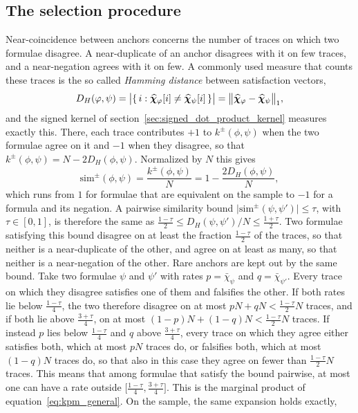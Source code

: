 \documentclass[titlepage,a4paper,11pt]{report}
\begin{document}
    \subsection{The selection procedure}\label{sec:selection_procedure}
    Near-coincidence between anchors concerns the number of traces on which two formulae disagree. A near-duplicate of an anchor disagrees with it on few traces, and a near-negation agrees with it on few. A commonly used measure that counts these traces is the so called \textit{Hamming distance} between satisfaction vectors,
    \begin{equation}\label{eq:hamming_distance}
        D_H(\varphi,\psi)=\bigl|\{\,i:\bm{\widehat\chi}_\varphi[i]\neq\bm{\widehat\chi}_\psi[i]\,\}\bigr|=\bigl\lVert\bm{\widehat\chi}_\varphi-\bm{\widehat\chi}_\psi\bigr\rVert_1 ,
    \end{equation}
    and the signed kernel of section~\ref{sec:signed_dot_product_kernel} measures exactly this. There, each trace contributes $+1$ to $k^\pm(\phi,\psi)$ when the two formulae agree on it and $-1$ when they disagree, so that $k^\pm(\phi,\psi)=N-2D_H(\phi,\psi)$. Normalized by $N$ this gives
    \begin{equation}\label{eq:sim_pm}
        \mathrm{sim}^\pm(\phi,\psi)=\frac{k^\pm(\phi,\psi)}{N}=1-\frac{2D_H(\phi,\psi)}{N},
    \end{equation}
    which runs from $1$ for formulae that are equivalent on the sample to $-1$ for a formula and its negation. A pairwise similarity bound  $\lvert\mathrm{sim}^\pm(\psi,\psi')\rvert\le\tau$, with $\tau \in [0,1]$, is therefore the same as $\frac{1-\tau}{2}\le D_H(\psi,\psi')/N\le\frac{1+\tau}{2}$. Two formulae satisfying this bound disagree on at least the fraction $\frac{1-\tau}{2}$ of the traces, so that neither is a near-duplicate of the other, and agree on at least as many, so that neither is a near-negation of the other. Rare anchors are kept out by the same bound. Take two formulae $\psi$ and $\psi'$ with rates $p=\bar\chi_\psi$ and $q=\bar\chi_{\psi'}$. Every trace on which they disagree satisfies one of them and falsifies the other. If both rates lie below $\frac{1-\tau}{4}$, the two therefore disagree on at most $pN+qN<\frac{1-\tau}{2}N$ traces, and if both lie above $\frac{3+\tau}{4}$, on at most $(1-p)N+(1-q)N<\frac{1-\tau}{2}N$ traces. If instead $p$ lies below $\frac{1-\tau}{4}$ and $q$ above $\frac{3+\tau}{4}$, every trace on which they agree either satisfies both, which at most $pN$ traces do, or falsifies both, which at most $(1-q)N$ traces do, so that also in this case they agree on fewer than $\frac{1-\tau}{2}N$ traces. This means that among formulae that satisfy the bound pairwise, at most one can have a rate outside $\bigl[\frac{1-\tau}{4},\frac{3+\tau}{4}\bigr]$. This is the marginal product of equation~\eqref{eq:kpm_general}. On the sample, the same expansion holds exactly,
\end{document}
